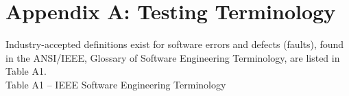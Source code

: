 
\section*{Appendix A:  Testing Terminology}

Industry-accepted definitions exist for software errors and defects (faults), found in the ANSI/IEEE, 
Glossary of Software Engineering Terminology, are
listed in Table A1. \\

Table A1 -- IEEE Software Engineering Terminology \cite{ieee} \\

\begin{tabular}{|p{1.3in}|p{4.7in}|} \hline


\end{tabular}

